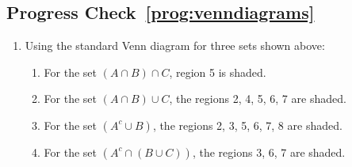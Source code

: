 \subsection*{Progress Check~\ref{prog:venndiagrams}}
\begin{enumerate}
  \item \begin{multicols}{2}
\begin{center}
\end{center}
Using the standard Venn diagram for three sets shown above:
\begin{enumerate}
  \item For the set $(A \cap B) \cap C$,  region 5 is shaded.
  \item For the set $(A \cap B) \cup C$, the regions 2, 4, 5, 6, 7 are shaded.
  \item For the set $(A^c \cup B)$, the regions 2, 3, 5, 6, 7, 8 are shaded.
  \item For the set $(A^c \cap (B \cup C))$, the regions 3, 6, 7 are shaded.
\end{enumerate}
\end{multicols}


\end{enumerate}



\endinput
